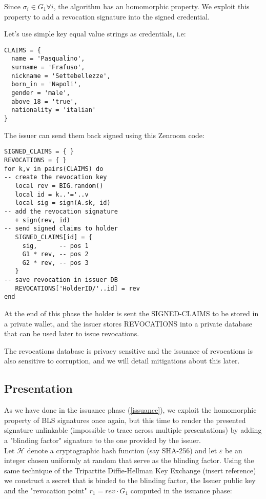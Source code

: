 \documentclass[conference]{IEEEtran}
\begin{document}
Since $\sigma_i\in G_1 \forall i$, the algorithm has an homomorphic
property. We exploit this property to add a revocation signature into
the signed credential.

Let's use simple key equal value strings as credentials, i.e:

\begin{lstlisting}[style=lua,caption={Holder requests signature of claims}]
CLAIMS = {
  name = 'Pasqualino',
  surname = 'Frafuso',
  nickname = 'Settebellezze',
  born_in = 'Napoli',
  gender = 'male',
  above_18 = 'true',
  nationality = 'italian'
}
\end{lstlisting}

The issuer can send them back signed using this Zenroom code:

\begin{lstlisting}[style=lua,caption={Issuer signs claims}]
SIGNED_CLAIMS = { }
REVOCATIONS = { }
for k,v in pairs(CLAIMS) do
-- create the revocation key
   local rev = BIG.random()
   local id = k..'='..v
   local sig = sign(A.sk, id)
-- add the revocation signature
   + sign(rev, id)
-- send signed claims to holder
   SIGNED_CLAIMS[id] = {
     sig,      -- pos 1
     G1 * rev, -- pos 2
     G2 * rev, -- pos 3
   }
-- save revocation in issuer DB
   REVOCATIONS['HolderID/'..id] = rev
end
\end{lstlisting}

At the end of this phase the holder is sent the SIGNED-CLAIMS
to be stored in a private wallet, and the issuer stores
REVOCATIONS into a private database that can be used later to
issue revocations.

The revocations database is privacy sensitive and the issuance of
revocations is also sensitive to corruption, and we will detail
mitigations about this later.

\subsection{Presentation} \label{presentation}

As we have done in the issuance phase (\ref{issuance}), we exploit the
homomorphic property of BLS signatures once again, but this time to
render the presented signature unlinkable (impossible to trace across
multiple presentations) by adding a "blinding factor" signature to the
one provided by the issuer. \\

Let $\mathcal{H}$ denote a cryptographic hash function (say SHA-256) and let $\varepsilon$ be an integer chosen uniformly at random that serve as the blinding factor.
Using the same technique of the Tripartite Diffie-Hellman Key Exchange (insert reference) we construct a secret that is binded to the blinding factor, the Issuer public key and the "revocation point" $r_1 = rev \cdot G_1$ computed in the issuance phase:
\end{document}
